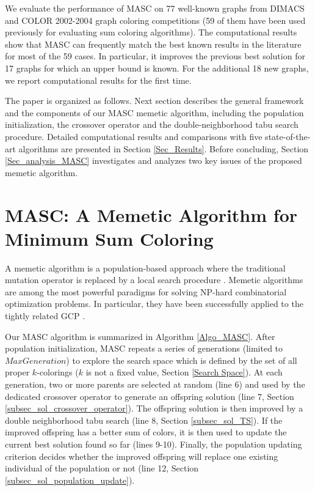 \documentclass{elsart}
\begin{document}
We evaluate the performance of MASC on 77 well-known graphs from DIMACS and COLOR 2002-2004 graph coloring competitions (59 of them have been used previously for evaluating sum coloring algorithms). The computational results show that MASC can frequently match the best known results in the literature for most of the 59 cases. In particular, it improves the previous best solution for 17 graphs for which an upper bound is known. For the additional 18 new graphs, we report computational results for the first time.

The paper is organized as follows. Next section describes the general framework and the components of our MASC memetic algorithm, including the population initialization,  the crossover operator and the double-neighborhood tabu search procedure. Detailed computational results and comparisons with five state-of-the-art algorithms are presented in Section \ref{Sec_Results}. Before concluding, Section \ref{Sec_analysis_MASC} investigates and analyzes two key issues of the proposed memetic algorithm.

\section{MASC: A Memetic Algorithm for Minimum Sum Coloring}
\label{Sec_Approach}

A memetic algorithm is a population-based approach where the traditional mutation operator is replaced by a local search procedure \cite{Moscato&Cotta2003,Neri&al2012}. Memetic algorithms are among the most powerful paradigms for solving NP-hard combinatorial optimization problems. In particular, they have been successfully applied to the tightly related GCP \cite{Galinier&Hao1999,Lu&Hao2010,Malaguti&al2008,Porumbel&al2010}.

Our MASC algorithm is summarized in Algorithm \ref{Algo_MASC}. After population initialization, MASC repeats a series of generations (limited to $MaxGeneration$) to explore the search space which is defined by the set of all proper $k$-colorings ($k$ is not a fixed value, Section \ref{Search Space}). At each generation, two or more parents are selected at random (line 6) and used by the dedicated crossover operator to generate an offspring solution (line 7, Section \ref{subsec_sol_crossover_operator}). The offspring solution is then improved by a double neighborhood tabu search (line 8, Section \ref{subsec_sol_TS}). If the improved offspring has a better sum of colors, it is then used to update the current best solution found so far (lines 9-10). Finally, the population updating criterion decides whether the improved offspring will replace one existing individual of the population or not (line 12, Section \ref{subsec_sol_population_update}).
\end{document}
